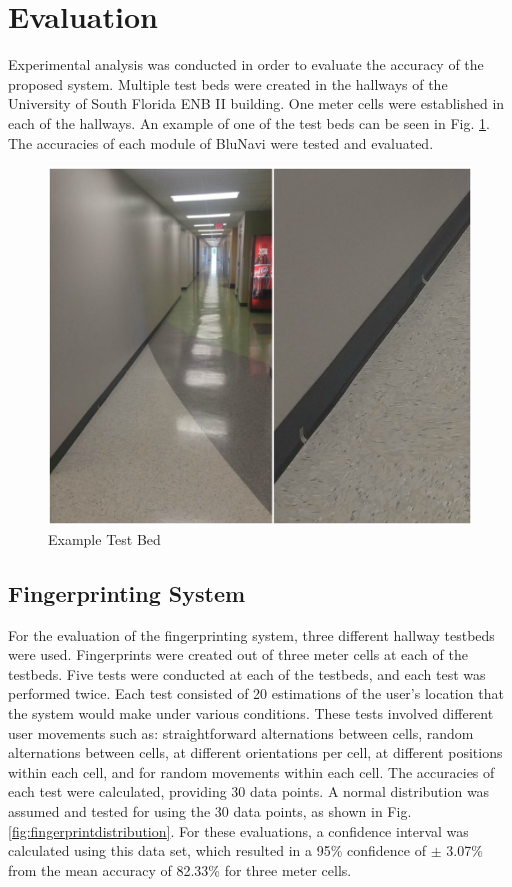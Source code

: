 \documentclass[conference]{IEEEtran}
\begin{document}
\section{Evaluation}

Experimental analysis was conducted in order to evaluate the accuracy of the proposed system. Multiple test beds were created in the hallways of the University of South Florida ENB II building. One meter cells were established in each of the hallways. An example of one of the test beds can be seen in Fig. \ref{fig:testbed}. The accuracies of each module of BluNavi were tested and evaluated.

\begin{figure}[h]
\centering
\includegraphics[scale=0.25]{TestbedCollage.png}
\caption{Example Test Bed}
\captionsetup{justification=centering,margin=2cm}
\label{fig:testbed}
\end{figure}

\subsection{Fingerprinting System}

For the evaluation of the fingerprinting system, three different hallway testbeds were used. Fingerprints were created out of three meter cells at each of the testbeds. Five tests were conducted at each of the testbeds, and each test was performed twice. Each test consisted of 20 estimations of the user’s location that the system would make under various conditions. These tests involved different user movements such as: straightforward alternations between cells, random alternations between cells, at different orientations per cell, at different positions within each cell, and for random movements within each cell. The accuracies of each test were calculated, providing 30 data points. A normal distribution was assumed and tested for using the 30 data points, as shown in Fig. \ref{fig:fingerprintdistribution}. For these evaluations, a confidence interval was calculated using this data set, which resulted in a 95\% confidence of $\pm$  3.07\% from the mean accuracy of 82.33\% for three meter cells.
\end{document}
